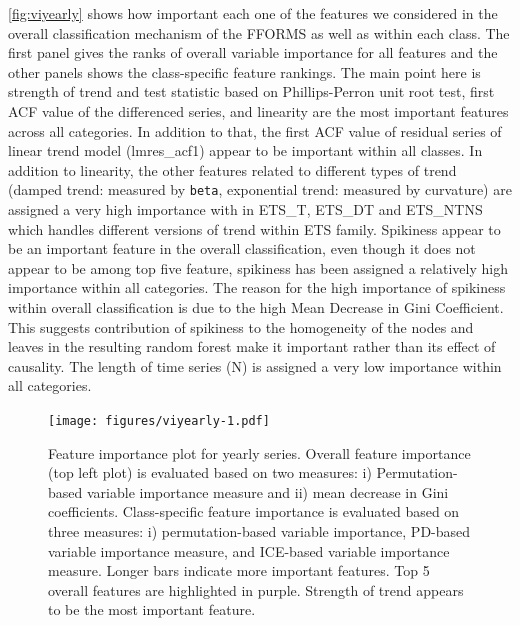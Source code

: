 \documentclass[11pt,a4paper,]{article}
\begin{document}
\autoref{fig:viyearly} shows how important each one of the features we considered in the overall classification mechanism of the FFORMS as well as within each class. The first panel gives the ranks of overall variable importance for all features and the other panels shows the class-specific feature rankings. The main point here is strength of trend and test statistic based on Phillips-Perron unit root test, first ACF value of the differenced series, and linearity are the most important features across all categories.
In addition to that, the first ACF value of residual series of linear trend model (lmres\_acf1) appear to be important within all classes. In addition to linearity, the other features related to different types of trend (damped trend: measured by \texttt{beta}, exponential trend: measured by curvature) are assigned a very high importance with in ETS\_T, ETS\_DT and ETS\_NTNS which handles different versions of trend within ETS family. Spikiness appear to be an important feature in the overall classification, even though it does not appear to be among top five feature, spikiness has been assigned a relatively high importance within all categories. The reason for the high importance of spikiness within overall classification is due to the high Mean Decrease in Gini Coefficient. This suggests contribution of spikiness to the homogeneity of the nodes and leaves in the resulting random forest make it important rather than its effect of causality. The length of time series (N) is assigned a very low importance within all categories.

\begin{figure}
\centering
\texttt{[image: figures/viyearly-1.pdf]}
\caption{\label{fig:viyearly}Feature importance plot for yearly series. Overall feature importance (top left plot) is evaluated based on two measures: i) Permutation-based variable importance measure and ii) mean decrease in Gini coefficients. Class-specific feature importance is evaluated based on three measures: i) permutation-based variable importance, PD-based variable importance measure, and ICE-based variable importance measure. Longer bars indicate more important features. Top 5 overall features are highlighted in purple. Strength of trend appears to be the most important feature.}
\end{figure}
\end{document}
